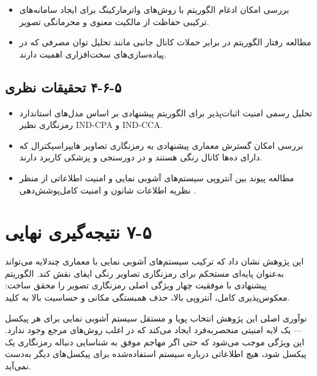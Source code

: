 \begin{itemize}
    \item بررسی امکان ادغام الگوریتم با روش‌های واترمارکینگ برای ایجاد سامانه‌های ترکیبی حفاظت از مالکیت معنوی و محرمانگی تصویر.
\end{itemize}

\begin{itemize}
    \item مطالعه رفتار الگوریتم در برابر حملات کانال جانبی مانند تحلیل توان مصرفی که در پیاده‌سازی‌های سخت‌افزاری اهمیت دارند.
\end{itemize}

\subsection{‏۵‏-‏۶‏-‏۴‏ تحقیقات نظری}

\begin{itemize}
    \item تحلیل رسمی امنیت اثبات‌پذیر برای الگوریتم پیشنهادی بر اساس مدل‌های استاندارد رمزنگاری نظیر IND-CPA و IND-CCA.
\end{itemize}

\begin{itemize}
    \item بررسی امکان گسترش معماری پیشنهادی به رمزنگاری تصاویر هایپراسپکترال که دارای ده‌ها کانال رنگی هستند و در دورسنجی و پزشکی کاربرد دارند.
\end{itemize}

\begin{itemize}
    \item مطالعه پیوند بین آنتروپی سیستم‌های آشوبی نمایی و امنیت اطلاعاتی از منظر نظریه اطلاعات شانون و امنیت کامل‌پوشش‌دهی .
\end{itemize}

\section{‏۵‏-‏۷‏ نتیجه‌گیری نهایی}

این پژوهش نشان داد که ترکیب سیستم‌های آشوبی نمایی با معماری چندلایه می‌تواند به‌عنوان پایه‌ای مستحکم برای رمزنگاری تصاویر رنگی ایفای نقش کند. الگوریتم پیشنهادی با موفقیت چهار ویژگی اصلی رمزنگاری تصویر را محقق ساخت: معکوس‌پذیری کامل، آنتروپی بالا، حذف همبستگی مکانی و حساسیت بالا به کلید.

نوآوری اصلی این پژوهش انتخاب پویا و مستقل سیستم آشوبی نمایی برای هر پیکسل --- یک لایه امنیتی منحصربه‌فرد ایجاد می‌کند که در اغلب روش‌های مرجع وجود ندارد. این ویژگی موجب می‌شود که حتی اگر مهاجم موفق به شناسایی دنباله رمزنگاری یک پیکسل شود، هیچ اطلاعاتی درباره سیستم استفاده‌شده برای پیکسل‌های دیگر به‌دست نمی‌آید.

